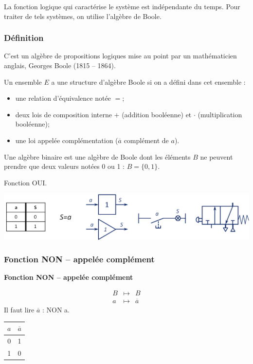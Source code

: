 \documentclass[10pt,fleqn]{article} %
\begin{document}
La fonction logique qui caractérise le système est indépendante du temps. Pour traiter de tels systèmes, on utilise l'algèbre de Boole. 

\subsubsection{Définition}
C'est un algèbre de propositions logiques mise au point par un mathématicien anglais, Georges Boole (1815 -- 1864).

\begin{defi}
Un ensemble $E$ a une structure d'algèbre Boole si on a défini dans cet ensemble :
\begin{itemize}
\item une relation d'équivalence notée $=$;
\item deux lois de composition interne $+$ (addition booléenne) et $\cdot$ (multiplication booléenne);
\item une loi appelée complémentation ($\overline{a}$ complément de $a$).
\end{itemize}
\end{defi}

Une algèbre binaire est une algèbre de Boole dont les éléments $B$ ne peuvent prendre que deux valeurs notées 0 ou 1 : $B=\{0,1 \}$. 

\begin{exemple}
Fonction OUI.

\begin{center}
\includegraphics[width=.9\textwidth]{images/oui}
\end{center}
\end{exemple}


\subsubsection{Fonction NON -- appelée complément}
\begin{defi}
\textbf{Fonction NON -- appelée complément}

\begin{minipage}[c]{.45\linewidth}
\begin{eqnarray*}
B &\longmapsto& B\\
a &\longmapsto& \overline{a}
\end{eqnarray*}
Il faut lire $\overline{a}$ : NON a.
\end{minipage} \hfill
\begin{minipage}[c]{.45\linewidth}
\begin{center}
\begin{tabular}{|c||c|}
\hline
$a$ & $\overline{a}$ \\
\hline
0 & 1 \\
\hline
1 & 0 \\
\hline
\end{tabular}
\end{center}
\end{minipage}
\end{defi}
\end{document}
